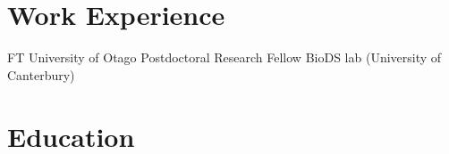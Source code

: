 \documentclass[10pt]{article} %
\newcommand{\email}[1]{{\href{mailto:#1}{#1}}}
\begin{document}
\begin{paracol}{2}

	



\section{Work Experience}




{FT} %
{University of Otago} %
{Postdoctoral Research Fellow} %
{BioDS lab (University of Canterbury)} %


\section{Education} 




\end{paracol}
\end{document}
